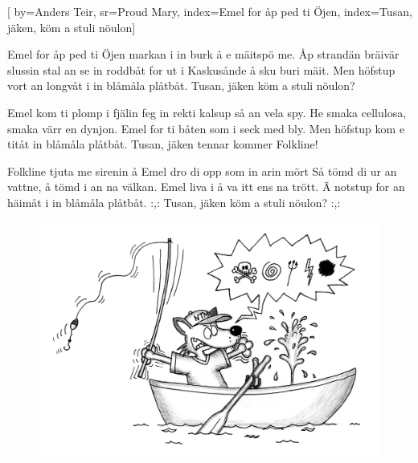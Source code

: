 

[ 		%
	by={Anders Teir},					%
	sr={Proud Mary},					%
	index={Emel for åp ped ti Öjen}, 						%
	index={Tusan, jäken, köm a stuli nöulon}]						%
	

\beginverse*						%
Emel for åp ped ti Öjen
markan i in burk å e mäitspö me.
Åp strandän bräivär slussin
stal an se in roddbåt
for ut i Kaskusånde å sku buri mäit.
Men höfstup vort an longvåt
i in blåmåla plåtbåt.
Tusan, jäken
köm a stuli nöulon?
\endverse							%

\beginverse*						%
Emel kom ti plomp i fjälin
feg in rekti kalsup så an vela spy.
He smaka cellulosa,
smaka värr en dynjon.
Emel for ti båten som i seck med bly.
Men höfstup kom e titåt
in blåmåla plåtbåt.
Tusan, jäken
tennar kommer Folkline!
\endverse							%

\beginverse*						%
Folkline tjuta me sirenin
å Emel dro di opp som in arin mört
Så tömd di ur an vattne,
å tömd i an na välkan.
Emel liva i å va itt ens na trött.
Ä notstup for an häimåt
i in blåmåla plåtbåt.
:,: Tusan, jäken
köm a stuli nöulon? :,:
\endverse							%
\endsong							%

\begin{figure}[!b]
\includegraphics[scale=.4]{../bilder/in_blamala_platbat.png} 
\end{figure}
